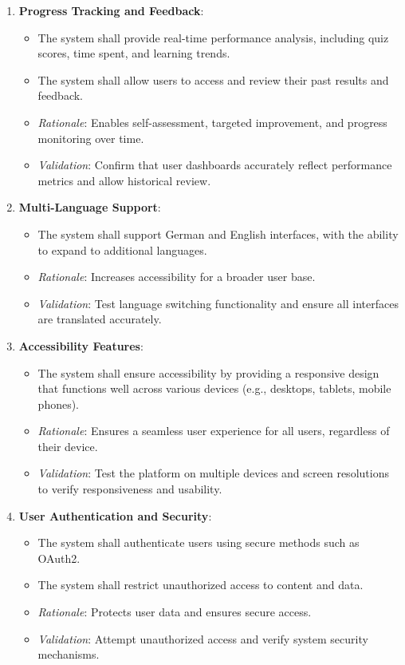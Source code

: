 \documentclass[12pt]{article}
\begin{document}
\begin{enumerate}
    \item \textbf{Progress Tracking and Feedback}:
        \begin{itemize}
            \item The system shall provide real-time performance analysis, including quiz scores, time spent, and learning trends.
            \item The system shall allow users to access and review their past results and feedback.
            \item \textit{Rationale}: Enables self-assessment, targeted improvement, and progress monitoring over time.
            \item \textit{Validation}: Confirm that user dashboards accurately reflect performance metrics and allow historical review.
        \end{itemize}

    \item \textbf{Multi-Language Support}:
        \begin{itemize}
            \item The system shall support German and English interfaces, with the ability to expand to additional languages.
            \item \textit{Rationale}: Increases accessibility for a broader user base.
            \item \textit{Validation}: Test language switching functionality and ensure all interfaces are translated accurately.
        \end{itemize}

    \item \textbf{Accessibility Features}:
    \begin{itemize}
        \item The system shall ensure accessibility by providing a responsive design that functions well across various devices (e.g., desktops, tablets, mobile phones).
        \item \textit{Rationale}: Ensures a seamless user experience for all users, regardless of their device.
        \item \textit{Validation}: Test the platform on multiple devices and screen resolutions to verify responsiveness and usability.
    \end{itemize}

    \item \textbf{User Authentication and Security}:
        \begin{itemize}
            \item The system shall authenticate users using secure methods such as OAuth2.
            \item The system shall restrict unauthorized access to content and data.
            \item \textit{Rationale}: Protects user data and ensures secure access.
            \item \textit{Validation}: Attempt unauthorized access and verify system security mechanisms.
        \end{itemize}


\end{enumerate}
\end{document}
